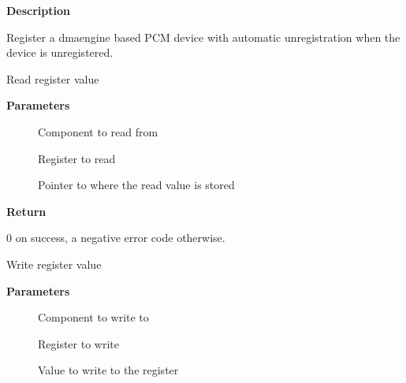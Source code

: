 \documentclass[a4paper,8pt,english]{sphinxmanual}
\begin{document}
\textbf{Description}

Register a dmaengine based PCM device with automatic unregistration when the
device is unregistered.

\begin{fulllineitems}
\label{sound/kernel-api/alsa-driver-api:c.snd_soc_component_read}
Read register value

\end{fulllineitems}


\textbf{Parameters}
\begin{description}
\item[{}] \leavevmode
Component to read from

\item[{}] \leavevmode
Register to read

\item[{}] \leavevmode
Pointer to where the read value is stored

\end{description}

\textbf{Return}

0 on success, a negative error code otherwise.

\begin{fulllineitems}
\label{sound/kernel-api/alsa-driver-api:c.snd_soc_component_write}
Write register value

\end{fulllineitems}


\textbf{Parameters}
\begin{description}
\item[{}] \leavevmode
Component to write to

\item[{}] \leavevmode
Register to write

\item[{}] \leavevmode
Value to write to the register

\end{description}
\end{document}
